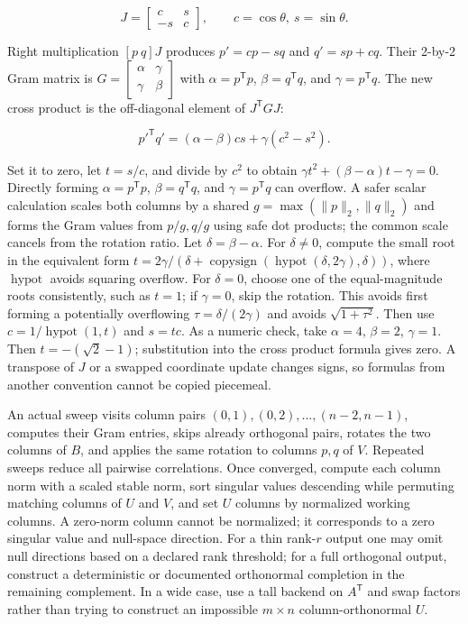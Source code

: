 \[
J=\begin{bmatrix}c&s\\-s&c\end{bmatrix},\qquad c=\cos\theta,\ s=\sin\theta.
\]

Right multiplication \([p\ q]J\) produces \(p'=cp-sq\) and \(q'=sp+cq\). Their 2-by-2 Gram matrix is \(G=\begin{bmatrix}\alpha&\gamma\\\gamma&\beta\end{bmatrix}\) with \(\alpha=p^\mathsf Tp\), \(\beta=q^\mathsf Tq\), and \(\gamma=p^\mathsf Tq\). The new cross product is the off-diagonal element of \(J^\mathsf TGJ\):

\[
{p'}^\mathsf Tq'=(\alpha-\beta)cs+\gamma(c^2-s^2).
\]

Set it to zero, let \(t=s/c\), and divide by \(c^2\) to obtain \(\gamma t^2+(\beta-\alpha)t-\gamma=0\). Directly forming \(\alpha=p^\mathsf Tp\), \(\beta=q^\mathsf Tq\), and \(\gamma=p^\mathsf Tq\) can overflow. A safer scalar calculation scales both columns by a shared \(g=\max(\|p\|_2,\|q\|_2)\) and forms the Gram values from \(p/g,q/g\) using safe dot products; the common scale cancels from the rotation ratio. Let \(\delta=\beta-\alpha\). For \(\delta\ne0\), compute the small root in the equivalent form \(t=2\gamma/(\delta+\operatorname{copysign}(\operatorname{hypot}(\delta,2\gamma),\delta))\), where \(\operatorname{hypot}\) avoids squaring overflow. For \(\delta=0\), choose one of the equal-magnitude roots consistently, such as \(t=1\); if \(\gamma=0\), skip the rotation. This avoids first forming a potentially overflowing \(\tau=\delta/(2\gamma)\) and avoids \(\sqrt{1+\tau^2}\). Then use \(c=1/\operatorname{hypot}(1,t)\) and \(s=tc\). As a numeric check, take \(\alpha=4\), \(\beta=2\), \(\gamma=1\). Then \(t=-(\sqrt2-1)\); substitution into the cross product formula gives zero. A transpose of \(J\) or a swapped coordinate update changes signs, so formulas from another convention cannot be copied piecemeal.

An actual sweep visits column pairs \((0,1),(0,2),\ldots,(n-2,n-1)\), computes their Gram entries, skips already orthogonal pairs, rotates the two columns of \(B\), and applies the same rotation to columns \(p,q\) of \(V\). Repeated sweeps reduce all pairwise correlations. Once converged, compute each column norm with a scaled stable norm, sort singular values descending while permuting matching columns of \(U\) and \(V\), and set \(U\) columns by normalized working columns. A zero-norm column cannot be normalized; it corresponds to a zero singular value and null-space direction. For a thin rank-\(r\) output one may omit null directions based on a declared rank threshold; for a full orthogonal output, construct a deterministic or documented orthonormal completion in the remaining complement. In a wide case, use a tall backend on \(A^\mathsf T\) and swap factors rather than trying to construct an impossible \(m\times n\) column-orthonormal \(U\).

